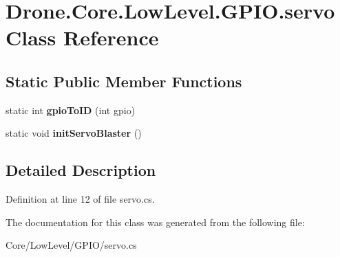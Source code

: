 \hypertarget{class_drone_1_1_core_1_1_low_level_1_1_g_p_i_o_1_1servo}{}\section{Drone.\+Core.\+Low\+Level.\+G\+P\+I\+O.\+servo Class Reference}
\label{class_drone_1_1_core_1_1_low_level_1_1_g_p_i_o_1_1servo}
\subsection*{Static Public Member Functions}
\begin{DoxyCompactItemize}
\item 
\hypertarget{class_drone_1_1_core_1_1_low_level_1_1_g_p_i_o_1_1servo_ae778a97dab5a776742b7ed5049adc52d}{}static int {\bfseries gpio\+To\+I\+D} (int gpio)\label{class_drone_1_1_core_1_1_low_level_1_1_g_p_i_o_1_1servo_ae778a97dab5a776742b7ed5049adc52d}

\item 
\hypertarget{class_drone_1_1_core_1_1_low_level_1_1_g_p_i_o_1_1servo_a3ea299881b73f63237216da800e12fbc}{}static void {\bfseries init\+Servo\+Blaster} ()\label{class_drone_1_1_core_1_1_low_level_1_1_g_p_i_o_1_1servo_a3ea299881b73f63237216da800e12fbc}

\end{DoxyCompactItemize}


\subsection{Detailed Description}


Definition at line 12 of file servo.\+cs.



The documentation for this class was generated from the following file\+:\begin{DoxyCompactItemize}
\item 
Core/\+Low\+Level/\+G\+P\+I\+O/servo.\+cs\end{DoxyCompactItemize}
